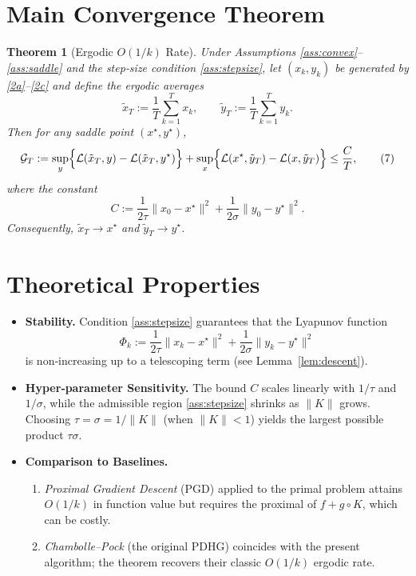 \documentclass[11pt]{article}
\newtheorem{theorem}{Theorem}[section]
\begin{document}
\section*{Main Convergence Theorem}
\begin{theorem}[Ergodic $O(1/k)$ Rate]\label{thm:ergodic}
Under Assumptions \ref{ass:convex}–\ref{ass:saddle} and the step‑size condition \eqref{ass:stepsize},
let $(x_{k},y_{k})$ be generated by \eqref{2a}–\eqref{2c} and define the ergodic averages
\[
\tilde{x}_{T}:=\frac{1}{T}\sum_{k=1}^{T}x_{k},\qquad
\tilde{y}_{T}:=\frac{1}{T}\sum_{k=1}^{T}y_{k}.
\]
Then for any saddle point $(x^{\star},y^{\star})$,
\[
\mathcal{G}_{T}
:=\sup_{y}\Bigl\{\mathcal{L}(\tilde{x}_{T},y)-\mathcal{L}(\tilde{x}_{T},y^{\star})\Bigr\}
+\sup_{x}\Bigl\{\mathcal{L}(x^{\star},\tilde{y}_{T})-\mathcal{L}(x,\tilde{y}_{T})\Bigr\}
\le \frac{C}{T},
\tag{7}
\]
where the constant
\[
C:=\frac{1}{2\tau}\|x_{0}-x^{\star}\|^{2}
     +\frac{1}{2\sigma}\|y_{0}-y^{\star}\|^{2}.
\tag{8}
\]
Consequently, $\tilde{x}_{T}\rightarrow x^{\star}$ and $\tilde{y}_{T}\rightarrow y^{\star}$.
\end{theorem}

\section*{Theoretical Properties}
\begin{itemize}
\item \textbf{Stability.} Condition \eqref{ass:stepsize} guarantees that the Lyapunov function 
\[
\Phi_{k}:=\frac{1}{2\tau}\|x_{k}-x^{\star}\|^{2}+\frac{1}{2\sigma}\|y_{k}-y^{\star}\|^{2}
\]
is non‑increasing up to a telescoping term (see Lemma~\ref{lem:descent}).
\item \textbf{Hyper‑parameter Sensitivity.} The bound $C$ scales linearly with $1/\tau$ and $1/\sigma$, while the admissible region \eqref{ass:stepsize} shrinks as $\|K\|$ grows. Choosing $\tau=\sigma=1/\|K\|$ (when $\|K\|<1$) yields the largest possible product $\tau\sigma$.
\item \textbf{Comparison to Baselines.}
    \begin{enumerate}
        \item \emph{Proximal Gradient Descent} (PGD) applied to the primal problem attains $O(1/k)$ in function value but requires the proximal of $f+g\circ K$, which can be costly.
        \item \emph{Chambolle–Pock} (the original PDHG) coincides with the present algorithm; the theorem recovers their classic $O(1/k)$ ergodic rate.
    \end{enumerate}
\end{itemize}
\end{document}
